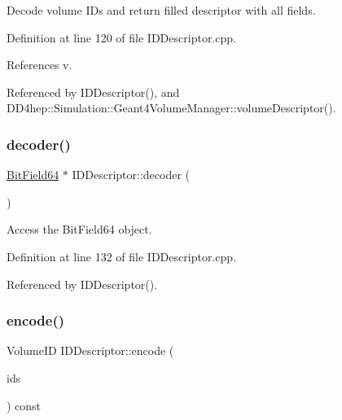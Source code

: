 Decode volume I\+Ds and return filled descriptor with all fields. 



Definition at line 120 of file I\+D\+Descriptor.\+cpp.



References v.



Referenced by I\+D\+Descriptor(), and D\+D4hep\+::\+Simulation\+::\+Geant4\+Volume\+Manager\+::volume\+Descriptor().

\hypertarget{class_d_d4hep_1_1_geometry_1_1_i_d_descriptor_ac62f98d6db97a51cadb2f17c58369d18}{}\label{class_d_d4hep_1_1_geometry_1_1_i_d_descriptor_ac62f98d6db97a51cadb2f17c58369d18} 
\subsubsection{\texorpdfstring{decoder()}{decoder()}}
{\footnotesize\ttfamily \hyperlink{class_d_d4hep_1_1_d_d_segmentation_1_1_bit_field64}{Bit\+Field64} $\ast$ I\+D\+Descriptor\+::decoder (\begin{DoxyParamCaption}{ }\end{DoxyParamCaption})}



Access the Bit\+Field64 object. 



Definition at line 132 of file I\+D\+Descriptor.\+cpp.



Referenced by I\+D\+Descriptor().

\hypertarget{class_d_d4hep_1_1_geometry_1_1_i_d_descriptor_a22f54f9094eae74d4c0b22dddbec1aef}{}\label{class_d_d4hep_1_1_geometry_1_1_i_d_descriptor_a22f54f9094eae74d4c0b22dddbec1aef} 
\subsubsection{\texorpdfstring{encode()}{encode()}}
{\footnotesize\ttfamily Volume\+ID I\+D\+Descriptor\+::encode (\begin{DoxyParamCaption}\item[{const std\+::vector$<$ \hyperlink{class_d_d4hep_1_1_geometry_1_1_i_d_descriptor_a6928b7adb965c1c276f22f62a0633750}{Vol\+ID} $>$ \&}]{ids }\end{DoxyParamCaption}) const}



